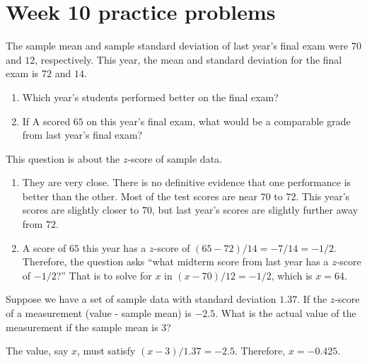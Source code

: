 \documentclass[../main.tex]{subfiles}
\begin{document}
\section{Week 10 practice problems}

\begin{exercise}
  The sample mean and sample standard deviation of last year's final exam were \(70\) and \(12\), respectively.  This year, the mean and standard deviation for the final exam is \(72\) and \(14\). 

  \begin{enumerate}
    \item Which year's students performed better on the final exam?
    \item If A scored \(65\) on this year's final exam, what would be a comparable grade from last year's final exam?
  \end{enumerate}

  \begin{solution}
    This question is about the \(z\)-score of sample data.

    \begin{enumerate}
      \item They are very close. There is no definitive evidence that one performance is better than the other. Most of the test scores are near \(70\) to \(72\). This year's scores are slightly closer to \(70\), but last year's scores are slightly further away from \(72\). 

      \item A score of \(65\) this year has a \(z\)-score of \((65 - 72)/14 = -7/14 = -1/2\).  Therefore, the question asks ``what midterm score from last year has a \(z\)-score of \(-1/2\)?'' That is to solve for \(x\) in \((x - 70)/12 = -1/2\), which is \(x = 64\).
    \end{enumerate}
  \end{solution}
\end{exercise}

\begin{exercise}
  Suppose we have a set of sample data with standard deviation \(1.37\). If the \(z\)-score of a measurement (value - sample mean) is \(-2.5\).  What is the actual value of the measurement if the sample mean is \(3\)?

  \begin{solution}
    The value, say \(x\), must satisfy \((x - 3) / 1.37 = -2.5\). Therefore, \(x = -0.425\).
  \end{solution}
\end{exercise}
\end{document}
